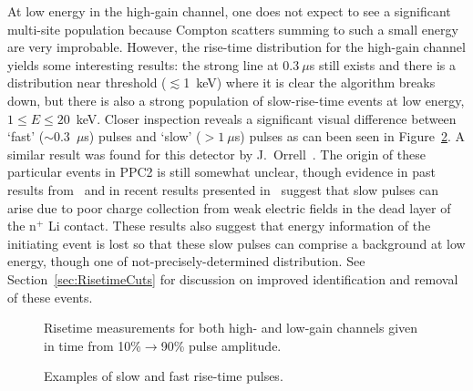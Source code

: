 At low energy in the high-gain channel, one does not expect to see a significant multi-site population because Compton scatters summing to such a small energy are very improbable.  However, the rise-time distribution for the high-gain channel yields some interesting results: the strong line at $0.3~\mu$s still exists and there is a distribution near threshold ($\lesssim$1~keV) where it is clear the algorithm breaks down, but there is also a strong population of slow-rise-time events at low energy, $1\leq E \leq20$~keV.  Closer inspection reveals a significant visual difference between `fast' ($\sim$0.3~$\mu$s) pulses and `slow' ($>1~\mu$s) pulses as can been seen in Figure~\ref{fig:PPC2RisetimeExamplePulses}.  A similar result was found for this detector by J.~Orrell~\cite{Orrell}.  The origin of these particular events in PPC2 is still somewhat unclear, though evidence in past results from~\cite{Strauss196780,Sakai:1971ff} and in recent results presented in~\cite{Aalseth:2010aa} suggest that slow pulses can arise due to poor charge collection from weak electric fields in the dead layer of the n$^{+}$ Li contact.  These results also suggest that energy information of the initiating event is lost so that these slow pulses can comprise a background at low energy, though one of not-precisely-determined distribution.  See Section~\ref{sec:RisetimeCuts} for discussion on improved identification and removal of these events.
	
				\begin{figure}
					\centering
					\caption[Rise-time measurements for high- and low-gain channels]
					{Risetime measurements for both high- and low-gain channels given in time from 10\%$\to$90\% 
					pulse amplitude.}
					\label{fig:PPC2RisetimeCalculations}
				\end{figure}		
	
				\begin{figure}
					\centering
					\caption[Examples of slow and fast rise-time pulses]
					{Examples of slow and fast rise-time pulses.}
					\label{fig:PPC2RisetimeExamplePulses}
				\end{figure}		
			
